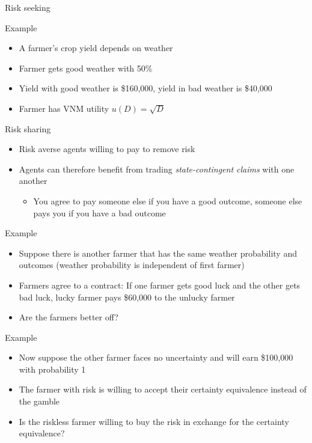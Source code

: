 \documentclass[10pt]{beamer}
\begin{document}
\begin{frame}[label={sec:org8e72400}]{Risk seeking}
\end{frame}

\begin{frame}[label={sec:orgfe61d1a}]{}
\alert{Example}
\begin{itemize}
\item A farmer's crop yield depends on weather
\item Farmer gets good weather with 50\%
\item Yield with good weather is \$160,000, yield in bad weather is \$40,000
\item Farmer has VNM utility \(u(D) = \sqrt{D}\)
\end{itemize}
\end{frame}

\begin{frame}[label={sec:org6790e51}]{}
\alert{Risk sharing}
\begin{itemize}
\item Risk averse agents willing to pay to remove risk
\item Agents can therefore benefit from trading \emph{state-contingent claims} with one another 
\begin{itemize}
\item You agree to pay someone else if you have a good outcome, someone else pays you if you have a bad outcome
\end{itemize}
\end{itemize}
\end{frame}

\begin{frame}[label={sec:org2611476}]{}
\alert{Example}
\begin{itemize}
\item Suppose there is another farmer that has the same weather probability and outcomes (weather probability is independent of first farmer)
\item Farmers agree to a contract: If one farmer gets good luck and the other gets bad luck, lucky farmer pays \$60,000 to the unlucky farmer
\item Are the farmers better off?
\end{itemize}
\end{frame}

\begin{frame}[label={sec:orgaace258}]{}
\alert{Example}
\begin{itemize}
\item Now suppose the other farmer faces no uncertainty and will earn \$100,000 with probability 1
\item The farmer with risk is willing to accept their certainty equivalence instead of the gamble
\item Is the riskless farmer willing to buy the risk in exchange for the certainty equivalence?
\end{itemize}
\end{frame}
\end{document}
